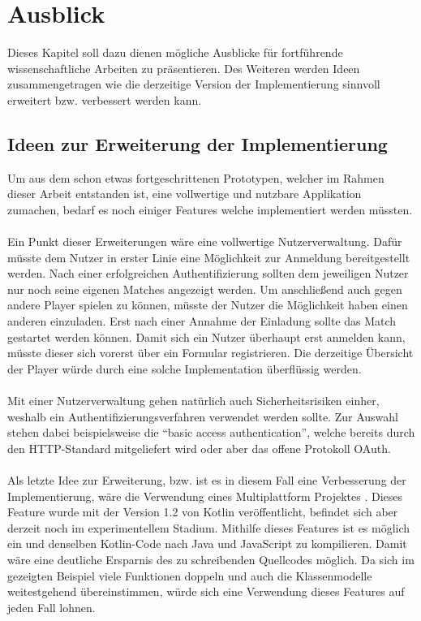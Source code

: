 
\chapter{Ausblick}
Dieses Kapitel soll dazu dienen mögliche Ausblicke für fortführende wissenschaftliche Arbeiten zu präsentieren. Des Weiteren werden Ideen zusammengetragen wie die derzeitige Version der Implementierung sinnvoll erweitert bzw. verbessert werden kann.

\section{Ideen zur Erweiterung der Implementierung}
Um aus dem schon etwas fortgeschrittenen Prototypen, welcher im Rahmen dieser Arbeit entstanden ist, eine vollwertige und nutzbare Applikation zumachen, bedarf es noch einiger Features welche implementiert werden müssten.\\
\\
Ein Punkt dieser Erweiterungen wäre eine vollwertige Nutzerverwaltung. Dafür müsste dem Nutzer in erster Linie eine Möglichkeit zur Anmeldung bereitgestellt werden. Nach einer erfolgreichen Authentifizierung sollten dem jeweiligen Nutzer nur noch seine eigenen Matches angezeigt werden.
Um anschließend auch gegen andere Player spielen zu können, müsste der Nutzer die Möglichkeit haben einen anderen einzuladen. Erst nach einer Annahme der Einladung sollte das Match gestartet werden können. Damit sich ein Nutzer überhaupt erst anmelden kann, müsste dieser sich vorerst über ein Formular registrieren. Die derzeitige Übersicht der Player würde durch eine solche Implementation überflüssig werden.\\
\\
Mit einer Nutzerverwaltung gehen natürlich auch Sicherheitsrisiken einher, weshalb ein Authentifizierungsverfahren verwendet werden sollte. Zur Auswahl stehen dabei beispielsweise die \enquote{basic access authentication}, welche bereits durch den \gls{HTTP}-Standard mitgeliefert wird oder aber das offene Protokoll \gls{OAuth}.\\
\\
Als letzte Idee zur Erweiterung, bzw. ist es in diesem Fall eine Verbesserung der Implementierung, wäre die Verwendung eines Multiplattform Projektes \cite{kotlinMultiPlattform}. Dieses Feature wurde mit der Version 1.2 von Kotlin veröffentlicht, befindet sich aber derzeit noch im experimentellem Stadium. Mithilfe dieses Features ist es möglich ein und denselben Kotlin-Code nach Java und JavaScript zu kompilieren. Damit wäre eine deutliche Ersparnis des zu schreibenden Quellcodes möglich. Da sich im gezeigten Beispiel viele Funktionen doppeln und auch die Klassenmodelle weitestgehend übereinstimmen, würde sich eine Verwendung dieses Features auf jeden Fall lohnen.

